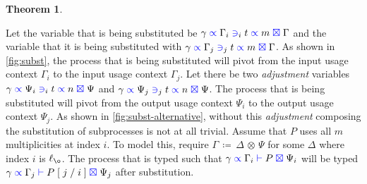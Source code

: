 \documentclass[a4paper,UKenglish,cleveref, autoref, thm-restate,authorcolumns]{lipics-v2019}
\theoremstyle{definition}
\newtheorem{nitheorem}[theorem]{Theorem}
\newcommand{\type}[1]{\textcolor{blue}{\operatorname{#1}}}
\newcommand{\subst}[3]{#1 \; [ \; #2 \; / \;#3 \;]}
\newcommand{\opctx}[3]{#1 \, \coloneqq \, #2 \, \otimes \, #3}
\newcommand{\lz}{\ell_{\o}}
\newcommand{\types}[4]{#1 \; \type{\propto} \; #2 \; \type{\vdash} \; #3 \; \type{\boxtimes} \; #4}
\newcommand{\contains}[6]{#1 \; \type{\propto} \; #2 \; \type{\ni}_{#3} \; #4 \; \type{\propto} \; #5 \; \type{\boxtimes} \; #6}
\begin{document}
\begin{nitheorem}
  \label{thm:subst-generalization}

  Let the variable that is being substituted be $\contains{\gamma}{\Gamma_i}{i}{t}{m}{\Gamma}$ and the variable that it is being substituted with $\contains{\gamma}{\Gamma_j}{j}{t}{m}{\Gamma}$.
  As shown in \autoref{fig:subst}, the process that is being substituted will pivot from the input usage context $\Gamma_i$ to the input usage context $\Gamma_j$.
  Let there be two \emph{adjustment} variables $\contains{\gamma}{\Psi_i}{i}{t}{n}{\Psi}$ and $\contains{\gamma}{\Psi_j}{j}{t}{n}{\Psi}$.
  The process that is being substituted will pivot from the output usage context $\Psi_i$ to the output usage context $\Psi_j$.
  As shown in \autoref{fig:subst-alternative}, without this \emph{adjustment} composing the substitution of subprocesses is not at all trivial.
  Assume that $P$ uses all $m$ multiplicities at index $i$.
  To model this, require $\opctx{\Gamma}{\Delta}{\Psi}$ for some $\Delta$ where index $i$ is $\lz$.
  The process that is typed such that $\types{\gamma}{\Gamma_i}{P}{\Psi_i}$ will be typed $\types{\gamma}{\Gamma_j}{\subst{P}{j}{i}}{\Psi_j}$ after substitution.
\end{nitheorem}
\end{document}
